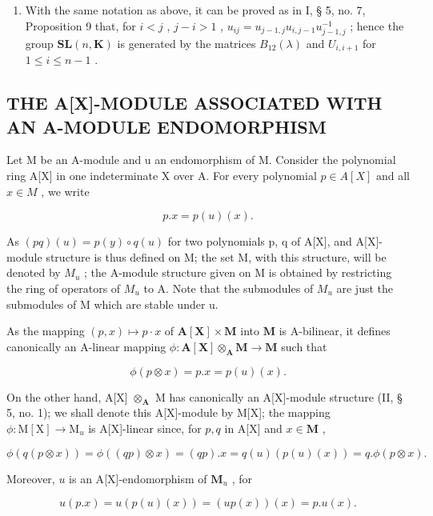 \begin{enumerate}
\def\labelenumi{(\arabic{enumi})}
\setcounter{enumi}{1}
\tightlist
\item
  With the same notation as above, it can be proved as in I, § 5, no. 7, Proposition 9 that, for \(i < j\) , \(j - i > 1\) , \(u_{ij} = u_{j-1,j} u_{i,j-1} u_{j-1,j}^{-1}\) ; hence the group \(\mathbf{SL}(n, \mathbf{K})\) is generated by the matrices \(B_{12}(\lambda)\) and \(U_{i,i+1}\) for \(1 \leqslant i \leqslant n - 1\) .
\end{enumerate}

\subsection{THE A{[}X{]}-MODULE ASSOCIATED WITH AN A-MODULE ENDOMORPHISM}

Let M be an A-module and u an endomorphism of M. Consider the polynomial ring A{[}X{]} in one indeterminate X over A. For every polynomial \(p \in A[X]\) and all \(x \in M\) , we write

\[
p. x = p (u) (x).\tag{43}
\]

As \((pq)(u) = p(y) \circ q(u)\) for two polynomials p, q of A{[}X{]}, and A{[}X{]}-module structure is thus defined on M; the set M, with this structure, will be denoted by \(M_{u}\) ; the A-module structure given on M is obtained by restricting the ring of operators of \(M_{u}\) to A. Note that the submodules of \(M_{u}\) are just the submodules of M which are stable under u.

As the mapping \((p, x) \mapsto p \cdot x\) of \(\mathbf{A}[\mathbf{X}] \times \mathbf{M}\) into \(\mathbf{M}\) is A-bilinear, it defines canonically an A-linear mapping \(\phi: \mathbf{A}[\mathbf{X}] \otimes_{\mathbf{A}} \mathbf{M} \to \mathbf{M}\) such that

\[
\phi (p \otimes x) = p. x = p (u) (x).\tag{44}
\]

On the other hand, A{[}X{]} \(\otimes_{\mathbf{A}}\) M has canonically an A{[}X{]}-module structure (II, § 5, no. 1); we shall denote this A{[}X{]}-module by M{[}X{]}; the mapping \(\phi: \mathrm{M}[\mathrm{X}] \to \mathrm{M}_u\) is A{[}X{]}-linear since, for \(p, q\) in A{[}X{]} and \(x \in \mathbf{M}\) ,

\[
\phi (q (p \otimes x)) = \phi ((q p) \otimes x) = (q p). x = q (u) (p (u) (x)) = q. \phi (p \otimes x).
\]

Moreover, \(u\) is an A{[}X{]}-endomorphism of \(\mathbf{M}_u\) , for

\[
u (p. x) = u (p (u) (x)) = (u p (x)) (x) = p. u (x).
\]

